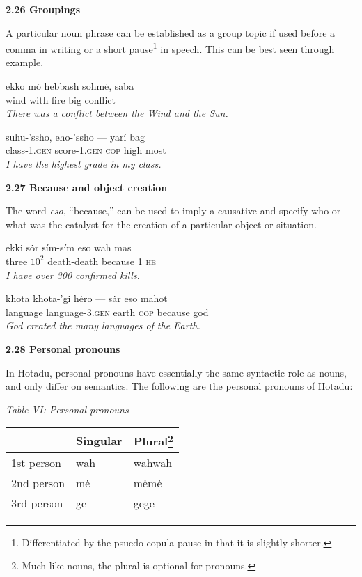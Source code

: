 \documentclass{article}[10pt]
\begin{document}
{\bf 2.26 Groupings}

A particular noun phrase can be established as a group topic if used before a comma in writing or a short pause\footnote{Differentiated by the psuedo-copula pause in that it is slightly shorter.} in speech. This can be best seen through example.

\begin{exe}
\ex
\gll ekko m\.{o} hebbash sohm\.{e}, saba\\
wind with fire big conflict\\
\trans \emph{There was a conflict between the Wind and the Sun.}

\ex
\gll suhu-'ssho, eho-'ssho --- yar\'{i} bag\\
class-\textsc{1.gen} score-\textsc{1.gen} \textsc{cop} high most\\
\trans \emph{I have the highest grade in my class.}
\end{exe}

{\bf 2.27 Because and object creation}

The word \emph{eso}, ``because,'' can be used to imply a causative and specify who or what was the catalyst for the creation of a particular object or situation.

\begin{exe}
\ex
\gll ekki s\.{o}r s\'{i}m-s\'{i}m eso wah mas\\
three $10^2$ death-death because 1 \textsc{he}\\
\trans \emph{I have over 300 confirmed kills.}

\ex
\gll khota khota-'gi h\.{e}ro --- s\.{a}r eso mahot\\
language language-\textsc{3.gen} earth \textsc{cop} because god\\
\trans \emph{God created the many languages of the Earth.}
\end{exe}

{\bf 2.28 Personal pronouns}

In Hotadu, personal pronouns have essentially the same syntactic role as nouns, and only differ on semantics. The following are the personal pronouns of Hotadu:

\begin{center}
\emph{Table VI: Personal pronouns}
\begin{tabularx}{\textwidth}{ |X|X|X| }
\hline
& \bf{Singular} & \bf{Plural}\footnote{Much like nouns, the plural is optional for pronouns.}\\ \hline
1st person & wah & wahwah \\ \hline
2nd person & m\.{e} & m\.{e}m\.{e} \\ \hline
3rd person & ge & gege \\ \hline
\end{tabularx}
\end{center}
\vspace{3mm}
\end{document}
